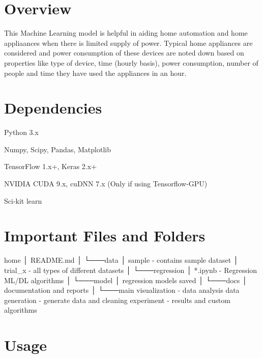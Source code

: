 \section*{Overview}

This Machine Learning model is helpful in aiding home automation and home appliaances when there is limited supply of power. Typical home appliances are considered and power consumption of these devices are noted down based on properties like type of device, time (hourly basis), power consumption, number of people and time they have used the appliances in an hour.

\section*{Dependencies}


\begin{DoxyEnumerate}
\item Python 3.\+x
\item Numpy, Scipy, Pandas, Matplotlib
\item Tensor\+Flow 1.\+x+, Keras 2.\+x+
\item N\+V\+I\+D\+IA C\+U\+DA 9.\+x, cu\+D\+NN 7.\+x (Only if using Tensorflow-\/\+G\+PU)
\item Sci-\/kit learn
\end{DoxyEnumerate}

\section*{Important Files and Folders}


\begin{DoxyCode}
home
│   README.md   
│
└───data
│      sample - contains sample dataset
│      trial\_x - all types of different datasets
│
└───regression
│      *.ipynb - Regression ML/DL algorithms
│   
└───model
│      regression models saved
│
└───docs
│      documentation and reports
│
└───main
       visualization - data analysis
       data generation - generate data and cleaning
       experiment - results and custom algorithms
\end{DoxyCode}


\section*{Usage}


